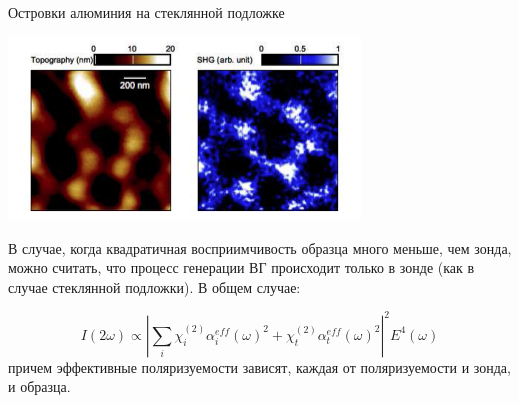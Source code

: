 \documentclass[9pt, compress, xcolor=table]{beamer}
\begin{document}
\begin{frame}{Островки алюминия на стеклянной подложке}

\begin{center}
\includegraphics[width=0.7\textwidth]{shg7}
\end{center}

В случае, когда квадратичная восприимчивость образца много меньше, чем зонда, можно считать, что процесс генерации ВГ происходит только в зонде (как в случае стеклянной подложки). 
В общем случае:

\begin{equation*}
I(2\omega)\propto |\sum_i\chi^{(2)}_{i}\alpha^{eff}_i(\omega)^2+\chi^{(2)}_{t}\alpha^{eff}_t(\omega)^2|^2 E^4(\omega)
\end{equation*}
причем эффективные поляризуемости зависят, каждая от поляризуемости и зонда, и образца.
\end{frame}
\end{document}
